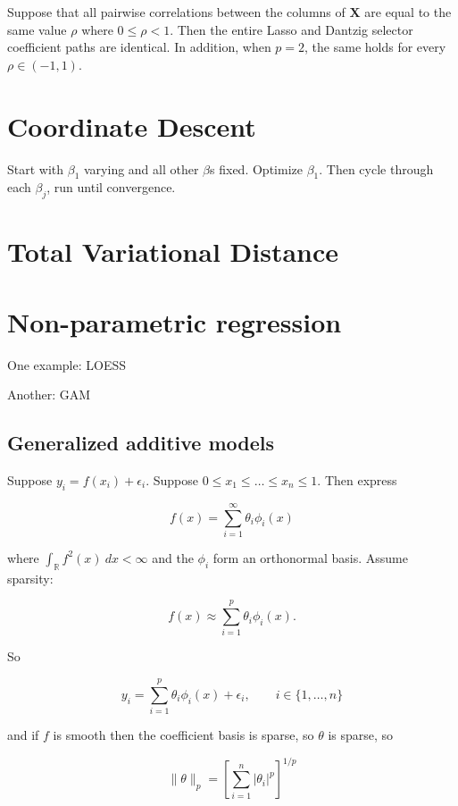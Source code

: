 \begin{theorem}
Suppose that all pairwise correlations between the columns of \(\boldsymbol{X}\) are equal to the same value \(\rho\) where \(0 \leq \rho < 1\). Then the entire Lasso and Dantzig selector coefficient paths are identical. In addition, when \(p=2\), the same holds for every \(\rho \in (-1, 1)\).

\end{theorem}

\section{Coordinate Descent}

Start with \(\beta_1\) varying and all other \(\beta\)s fixed. Optimize \(\beta_1\). Then cycle through each \(\beta_j\), run until convergence.




\section{Total Variational Distance}

\section{Non-parametric regression}

One example: LOESS 

Another: GAM

\subsection{Generalized additive models}

Suppose \(y_i = f(x_i) + \epsilon_i \). Suppose \(0 \leq x_1 \leq \ldots  \leq x_n \leq 1\). Then express

\[
f(x) = \sum_{i=1}^\infty \theta_i \phi_i(x) 
\]

where \(\int_{\mathbb{R}} f^2(x) \ dx < \infty\) and the \(\phi_i\) form an orthonormal basis. Assume sparsity:

\[
f(x) \approx \sum_{i=1}^p \theta_i \phi_i(x).
\]

So

\[
y_i = \sum_{i=1}^p \theta_i \phi_i(x) + \epsilon_i, \qquad i \in \{1, \ldots, n\}
\]

and if \(f\) is smooth then the coefficient basis is sparse, so \(\theta\) is sparse, so 

\[
\lVert \theta \rVert_p = \left[  \sum_{i=1}^n | \theta_i|^p\right]^{1/p}
\]

